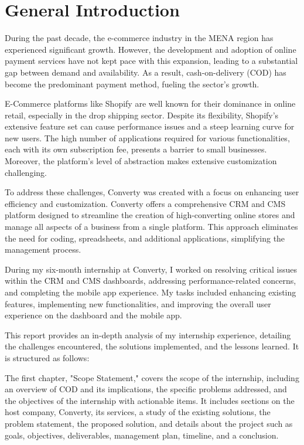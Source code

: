 \chapter*{General Introduction}

During the past decade, the e-commerce industry in the MENA region has experienced significant growth. However, the development and adoption of online payment services have not kept pace with this expansion, leading to a substantial gap between demand and availability. As a result, cash-on-delivery (COD) has become the predominant payment method, fueling the sector's growth.

E-Commerce platforms like Shopify are well known for their dominance in online retail, especially in the drop shipping sector. Despite its flexibility, Shopify’s extensive feature set can cause performance issues and a steep learning curve for new users. The high number of applications required for various functionalities, each with its own subscription fee, presents a barrier to small businesses. Moreover, the platform’s level of abstraction makes extensive customization challenging.

To address these challenges, Converty was created with a focus on enhancing user efficiency and customization. Converty offers a comprehensive CRM and CMS platform designed to streamline the creation of high-converting online stores and manage all aspects of a business from a single platform. This approach eliminates the need for coding, spreadsheets, and additional applications, simplifying the management process.

During my six-month internship at Converty, I worked on resolving critical issues within the CRM and CMS dashboards, addressing performance-related concerns, and completing the mobile app experience. My tasks included enhancing existing features, implementing new functionalities, and improving the overall user experience on the dashboard and the mobile app.

This report provides an in-depth analysis of my internship experience, detailing the challenges encountered, the solutions implemented, and the lessons learned. It is structured as follows:

The first chapter, "Scope Statement," covers the scope of the internship, including an overview of COD and its implications, the specific problems addressed, and the objectives of the internship with actionable items. It includes sections on the host company, Converty, its services, a study of the existing solutions, the problem statement, the proposed solution, and details about the project such as goals, objectives, deliverables, management plan, timeline, and a conclusion.


